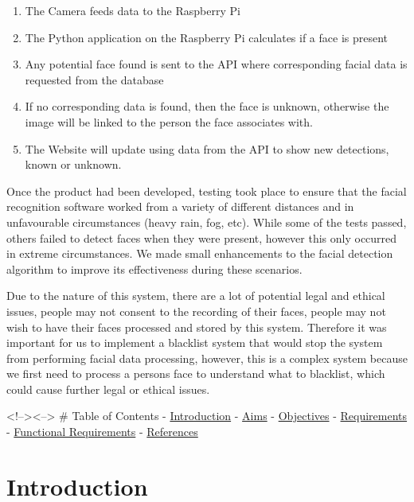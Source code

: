 \documentclass[
  english,
  a4paper,
,tablecaptionabove
]{scrartcl}
\providecommand{\tightlist}{%
  \setlength{\itemsep}{0pt}\setlength{\parskip}{0pt}}
\begin{document}
\begin{enumerate}
\def\labelenumi{\arabic{enumi}.}
\tightlist
\item
  The Camera feeds data to the Raspberry Pi
\item
  The Python application on the Raspberry Pi calculates if a face is
  present
\item
  Any potential face found is sent to the API where corresponding facial
  data is requested from the database
\item
  If no corresponding data is found, then the face is unknown, otherwise
  the image will be linked to the person the face associates with.
\item
  The Website will update using data from the API to show new
  detections, known or unknown.
\end{enumerate}

Once the product had been developed, testing took place to ensure that
the facial recognition software worked from a variety of different
distances and in unfavourable circumstances (heavy rain, fog, etc).
While some of the tests passed, others failed to detect faces when they
were present, however this only occurred in extreme circumstances. We
made small enhancements to the facial detection algorithm to improve its
effectiveness during these scenarios.

Due to the nature of this system, there are a lot of potential legal and
ethical issues, people may not consent to the recording of their faces,
people may not wish to have their faces processed and stored by this
system. Therefore it was important for us to implement a blacklist
system that would stop the system from performing facial data
processing, however, this is a complex system because we first need to
process a persons face to understand what to blacklist, which could
cause further legal or ethical issues.

\newpage

\textless!--\textgreater\textless--\textgreater{} \# Table of Contents -
\protect\hyperlink{introduction}{Introduction} -
\protect\hyperlink{aims}{Aims} -
\protect\hyperlink{objectives}{Objectives} -
\protect\hyperlink{requirements}{Requirements} -
\protect\hyperlink{functional-requirements}{Functional Requirements} -
\protect\hyperlink{references}{References}

\newpage

\hypertarget{introduction}{%
\section{Introduction}\label{introduction}}
\end{document}
